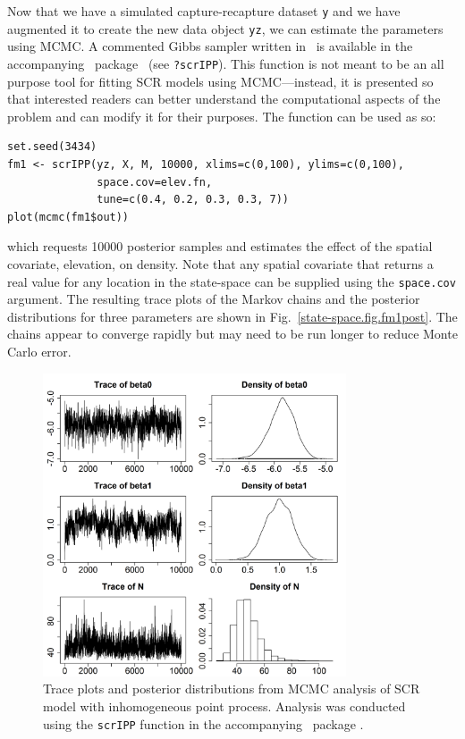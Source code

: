 Now that we have a simulated capture-recapture dataset \texttt{y} and we have
augmented it to create the new data object \texttt{yz}, we can
estimate the parameters using MCMC.  A commented Gibbs sampler written
in \R~is available in the accompanying \R~package \scrbook~(see
\texttt{?scrIPP}). This function is not meant to be an all purpose
tool for fitting SCR models using MCMC---instead, it is presented so
that interested readers can better understand the computational
aspects of the problem and can modify it for their purposes.
The function can be used as so:
\begin{samepage}
  \begin{small}
\begin{verbatim}
set.seed(3434)
fm1 <- scrIPP(yz, X, M, 10000, xlims=c(0,100), ylims=c(0,100),
              space.cov=elev.fn,
              tune=c(0.4, 0.2, 0.3, 0.3, 7))
plot(mcmc(fm1$out))
\end{verbatim}
  \end{small}
\end{samepage}
which requests 10000 posterior samples and estimates the effect of the
spatial covariate, elevation, on density. Note that any spatial
covariate that returns a real value for any location in the
state-space can be supplied using the \texttt{space.cov} argument. The resulting
trace plots of the Markov chains and the posterior distributions for
three parameters are
shown in Fig.~\ref{state-space.fig.fm1post}. The chains appear to
converge rapidly but may need to be run longer to reduce Monte Carlo
error.

\begin{figure}
  \centering
  \includegraphics[width=0.8\textwidth]{Ch11/figs/fm1p}
  \caption{Trace plots and posterior distributions from MCMC analysis
    of SCR model with inhomogeneous point process. Analysis was
    conducted using the \texttt{scrIPP} function in the accompanying
    \R~package \scrbook.}
  \label{fig:state-space.fig.fm1post}
\end{figure}

